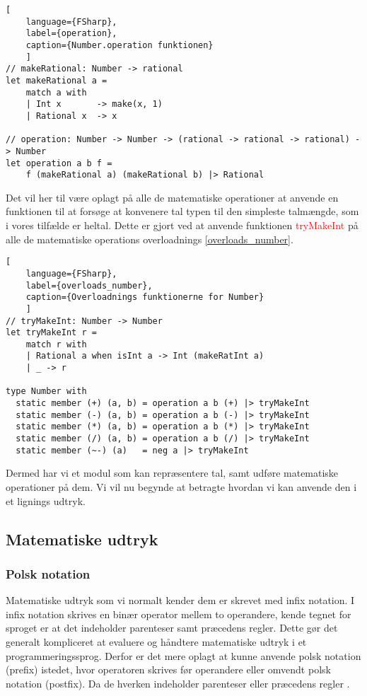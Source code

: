 \documentclass{article}
\begin{document}
\begin{lstlisting}[
    language={FSharp},
    label={operation}, 
    caption={Number.operation funktionen}
    ]
// makeRational: Number -> rational
let makeRational a =
    match a with
    | Int x       -> make(x, 1)
    | Rational x  -> x

// operation: Number -> Number -> (rational -> rational -> rational) -> Number
let operation a b f =
    f (makeRational a) (makeRational b) |> Rational
\end{lstlisting}

Det vil her til være oplagt på alle de matematiske operationer at anvende en funktionen til at forsøge at konvenere tal typen til den simpleste talmængde, som i vores tilfælde er heltal. Dette er gjort ved at anvende funktionen \textcolor{red}{tryMakeInt} på alle de matematiske operations overloadnings \ref{overloads_number}.

\begin{lstlisting}[
    language={FSharp},
    label={overloads_number}, 
    caption={Overloadnings funktionerne for Number}
    ]
// tryMakeInt: Number -> Number
let tryMakeInt r =
    match r with
    | Rational a when isInt a -> Int (makeRatInt a)
    | _ -> r
    
type Number with
  static member (+) (a, b) = operation a b (+) |> tryMakeInt
  static member (-) (a, b) = operation a b (-) |> tryMakeInt
  static member (*) (a, b) = operation a b (*) |> tryMakeInt
  static member (/) (a, b) = operation a b (/) |> tryMakeInt
  static member (~-) (a)   = neg a |> tryMakeInt
\end{lstlisting}

Dermed har vi et modul som kan repræsentere tal, samt udføre matematiske operationer på dem. Vi vil nu begynde at betragte hvordan vi kan anvende den i et lignings udtryk.

\subsection{Matematiske udtryk}
\subsubsection{Polsk notation}
Matematiske udtryk som vi normalt kender dem er skrevet med infix notation. I infix notation skrives en binær operator mellem to operandere, kende tegnet for sproget er at det indeholder parenteser samt præcedens regler. Dette gør det generalt kompliceret at evaluere og håndtere matematiske udtryk i et programmeringssprog. Derfor er det mere oplagt at kunne anvende polsk notation (prefix) istedet, hvor operatoren skrives før operandere eller omvendt polsk notation (postfix). Da de hverken indeholder parenteser eller præcedens regler . 
\end{document}
